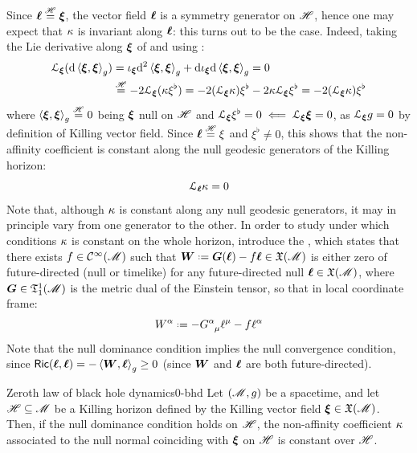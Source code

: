 Since $ \boldsymbol{\ell} \overset{\mathscr{H}}{=} \boldsymbol{\xi} $, the vector field $ \boldsymbol{\ell} $ is a symmetry generator on $ \mathscr{H} $, hence one may expect that $ \kappa $ is invariant along $ \boldsymbol{\ell} $: this turns out to be the case. Indeed, taking the Lie derivative along $ \boldsymbol{\xi} $ of  and using :
\begin{equation*}
  \begin{split}
    \EuScript{L}_{\boldsymbol{\xi}} (\mathrm{d} \braket{\boldsymbol{\xi} , \boldsymbol{\xi}}_g)
    & = \iota_{\boldsymbol{\xi}} \mathrm{d}^2 \braket{\boldsymbol{\xi} , \boldsymbol{\xi}}_g + \mathrm{d} \iota_{\boldsymbol{\xi}} \mathrm{d} \braket{\boldsymbol{\xi} , \boldsymbol{\xi}}_g = 0 \\
    & \overset{\mathscr{H}}{=} - 2 \EuScript{L}_{\boldsymbol{\xi}} (\kappa \xi^\flat) = -2 (\EuScript{L}_{\boldsymbol{\xi}} \kappa) \xi^\flat - 2 \kappa \EuScript{L}_{\boldsymbol{\xi}} \xi^\flat = -2 (\EuScript{L}_{\boldsymbol{\xi}} \kappa) \xi^\flat
  \end{split}
\end{equation*}
where $ \braket{\boldsymbol{\xi} , \boldsymbol{\xi}}_g \overset{\mathscr{H}}{=} 0 $ being $ \boldsymbol{\xi} $ null on $ \mathscr{H} $ and $ \EuScript{L}_{\boldsymbol{\xi}} \xi^\flat = 0 \impliedby \EuScript{L}_{\boldsymbol{\xi}} \boldsymbol{\xi} = 0 $, as $ \EuScript{L}_{\boldsymbol{\xi}} g = 0 $ by definition of Killing vector field. Since $ \boldsymbol{\ell} \overset{\mathscr{H}}{=} \xi $ and $ \xi^\flat \neq 0 $, this shows that the non-affinity coefficient is constant along the null geodesic generators of the Killing horizon:
\begin{equation}
  \EuScript{L}_{\boldsymbol{\ell}} \kappa = 0
  \label{eq:sg-const}
\end{equation}
Note that, although $ \kappa $ is constant along any null geodesic generators, it may in principle vary from one generator to the other. In order to study under which conditions $ \kappa $ is constant on the whole horizon, introduce the , which states that there exists $ f \in \mathcal{C}^{\infty}(\mathscr{M}) $ such that $ \bs{W} \defeq \bs{G}(\nn) - f \nn \in \xm $ is either zero of future-directed (null or timelike) for any future-directed null $ \boldsymbol{\ell} \in \mathfrak{X}(\mathscr{M}) $, where $ \boldsymbol{G} \in \mathfrak{T}^{1}_{1}(\mathscr{M}) $ is the metric dual of the Einstein tensor, so that in local coordinate frame:
\begin{equation}
  W^\alpha \defeq - \tensor{G}{^\alpha_\mu} \ell^\mu - f \ell^\alpha
  \label{eq:null-dominance-condition}
\end{equation}
Note that the null dominance condition implies the null convergence condition, since $ \textsf{Ric}(\boldsymbol{\ell} , \boldsymbol{\ell}) = - \braket{\boldsymbol{W} , \boldsymbol{\ell}}_g \geq 0 $ (since $ \boldsymbol{W} $ and $ \boldsymbol{\ell} $ are both future-directed).

\begin{theorem}{Zeroth law of black hole dynamics}{0-bhd}
  Let $ (\mathscr{M} , g) $ be a spacetime, and let $ \mathscr{H} \subseteq \mathscr{M} $ be a Killing horizon defined by the Killing vector field $ \boldsymbol{\xi} \in \mathfrak{X}(\mathscr{M}) $. Then, if the null dominance condition holds on $ \mathscr{H} $, the non-affinity coefficient $ \kappa $ associated to the null normal coinciding with $ \boldsymbol{\xi} $ on $ \mathscr{H} $ is constant over $ \mathscr{H} $.
\end{theorem}

